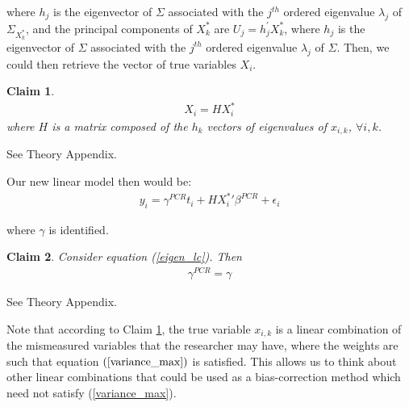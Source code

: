 \documentclass[10pt]{article}
\makeatletter
\newtheorem{claim}{Claim}
\renewenvironment{proof}[1][\proofname] {\par\pushQED{\qed}\normalfont\topsep6\p@\@plus6\p@\relax\trivlist\item[\hskip\labelsep\bfseries#1\@addpunct{.}]\ignorespaces}{\popQED\endtrivlist\@endpefalse}
\makeatother
\begin{document}
        where $h_j$ is the eigenvector of $\Sigma$ associated with the $j^{t h}$ ordered eigenvalue $\lambda_{j}$ of $\Sigma_{X^*_k}$, and the principal components of $X^*_k$ are $U_{j}=h_{j}^{\prime} X^*_k$, where $h_{j}$ is the eigenvector of $\Sigma$ associated with the $j^{t h}$ ordered eigenvalue $\lambda_{j}$ of $\Sigma$. Then, we could then retrieve the vector of true variables $X_i$.

        \begin{claim} \label{linear_combo}
            \begin{align}
                X_i=HX^*_i
            \end{align}
        where $H$ is a matrix composed of the $h_k$ vectors of eigenvalues of $x_{i,k}$, $\forall i,k$.
        \end{claim}

        \begin{proof}
            See Theory Appendix.
        \end{proof}
 
        Our new linear model then would be:
        \begin{align} \label{eigen_lc}
            y_i = \gamma^{PCR} t_i + H{X^*_i}'\beta^{PCR} + \epsilon_i
        \end{align}
        
        where $\gamma$ is identified.

        \begin{claim}
        Consider equation (\ref{eigen_lc}). Then
            \begin{align}
                {\gamma}^{PCR} = \gamma
            \end{align}
        \end{claim}

        \begin{proof}
            See Theory Appendix.
        \end{proof}
        
        Note that according to Claim \ref{linear_combo}, the true variable $x_{i,k}$ is a linear combination of the mismeasured variables that the researcher may have, where the weights are such that equation $(\ref{variance_max})$ is satisfied. This allows us to think about other linear combinations that could be used as a bias-correction method which need not satisfy (\ref{variance_max}). 
        
\end{document}
